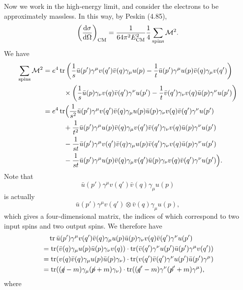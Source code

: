 \documentclass[hyperref, a4paper]{article}
\newcommand{\fsl}[1]{{\centernot{#1}}}
\begin{document}
Now we work in the high-energy limit, and consider the electrons to be approximately massless. In this way, by 
Peskin (4.85),
\[
    \left( \dv{\sigma}{\Omega} \right)_\text{CM} = \frac{1}{64 \pi^2 E_\text{CM}^2} \frac{1}{4} \sum_\text{spins} \mathcal{M}^2.
\]
We have 
\[
    \begin{aligned}
        \sum_\text{spins} \mathcal{M}^2 &= e^4 \trace \left( \frac{1}{s} \bar{u}(p') \gamma^\mu v(q') \bar{v}(q) \gamma_\mu u(p) - \frac{1}{t} \bar{u}(p') \gamma^\mu u(p) \bar{v}(q) \gamma_\mu v(q') \right) \\
        &\quad \quad \quad \times \left( \frac{1}{s} \bar{u}(p) \gamma_\nu v(q) \bar{v}(q') \gamma^\nu u(p') - \frac{1}{t} \bar{v}(q') \gamma_\nu v(q) \bar{u}(p) \gamma^\nu u(p') \right) \\
        &= e^4 \trace \Bigl( \frac{1}{s^2} \bar{u}(p') \gamma^\mu v(q') \bar{v}(q) \gamma_\mu u(p) \bar{u}(p) \gamma_\nu v(q) \bar{v}(q') \gamma^\nu u(p') \\
        &\quad \quad \quad + \frac{1}{t^2} \bar{u}(p') \gamma^\mu u(p) \bar{v}(q) \gamma_\mu v(q') \bar{v}(q') \gamma_\nu v(q) \bar{u}(p) \gamma^\nu u(p') \\
        &\quad \quad \quad - \frac{1}{st} \bar{u}(p') \gamma^\mu v(q') \bar{v}(q) \gamma_\mu u(p) \bar{v}(q') \gamma_\nu v(q) \bar{u}(p) \gamma^\nu u(p') \\
        &\quad \quad \quad - \frac{1}{st} \bar{u}(p') \gamma^\mu u(p) \bar{v}(q) \gamma_\mu v(q') \bar{u}(p) \gamma_\nu v(q) \bar{v}(q') \gamma^\nu u(p') \Bigr). 
    \end{aligned}
\]
Note that 
\[
    \bar{u}(p') \gamma^\mu v(q') \bar{v}(q) \gamma_\mu u(p)
\]
is actually 
\[
    \bar{u}(p') \gamma^\mu v(q') \otimes \bar{v}(q) \gamma_\mu u(p),
\]
which gives a four-dimensional matrix, the indices of which correspond to two input spins and two output spins.
We therefore have 
\[
    \begin{aligned}
        &\quad \trace \bar{u}(p') \gamma^\mu v(q') \bar{v}(q) \gamma_\mu u(p) \bar{u}(p) \gamma_\nu v(q) \bar{v}(q') \gamma^\nu u(p') \\
        &= \trace(\bar{v}(q) \gamma_\mu u(p) \bar{u}(p) \gamma_\nu v(q)) \cdot \trace(\bar{v}(q') \gamma^\nu u(p') \bar{u}(p') \gamma^\mu v(q')) \\
        &= \trace( v(q) \bar{v}(q) \gamma_\mu u(p) \bar{u}(p) \gamma_\nu ) \cdot \trace( v(q') \bar{v}(q') \gamma^\nu u(p') \bar{u}(p') \gamma^\mu ) \\
        &= \trace( (\fsl{q} - m) \gamma_\mu (\fsl{p} + m) \gamma_\nu ) \cdot \trace( (\fsl{q}' - m) \gamma^\nu (\fsl{p}' + m) \gamma^\mu ),
    \end{aligned}
\]
where 
\end{document}

